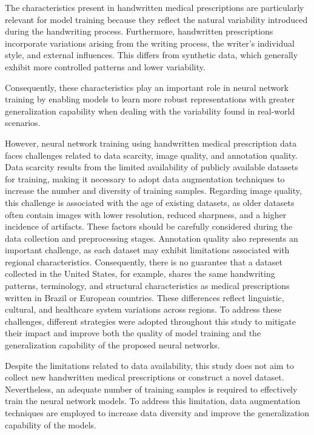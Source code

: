 \documentclass[11pt,a4paper]{article}
\begin{document}
The characteristics present in handwritten medical prescriptions are particularly relevant for model training because they reflect the natural variability introduced during the handwriting process. Furthermore, handwritten prescriptions incorporate variations arising from the writing process, the writer's individual style, and external influences. This differs from synthetic data, which generally exhibit more controlled patterns and lower variability.

Consequently, these characteristics play an important role in neural network training by enabling models to learn more robust representations with greater generalization capability when dealing with the variability found in real-world scenarios.



However, neural network training using handwritten medical prescription data faces challenges related to data scarcity, image quality, and annotation quality. Data scarcity results from the limited availability of publicly available datasets for training, making it necessary to adopt data augmentation techniques to increase the number and diversity of training samples. Regarding image quality, this challenge is associated with the age of existing datasets, as older datasets often contain images with lower resolution, reduced sharpness, and a higher incidence of artifacts. These factors should be carefully considered during the data collection and preprocessing stages. Annotation quality also represents an important challenge, as each dataset may exhibit limitations associated with regional characteristics. Consequently, there is no guarantee that a dataset collected in the United States, for example, shares the same handwriting patterns, terminology, and structural characteristics as medical prescriptions written in Brazil or European countries. These differences reflect linguistic, cultural, and healthcare system variations across regions.  To address these challenges, different strategies were adopted throughout this study to mitigate their impact and improve both the quality of model training and the generalization capability of the proposed neural networks.






Despite the limitations related to data availability, this study does not aim to collect new handwritten medical prescriptions or construct a novel dataset. Nevertheless, an adequate number of training samples is required to effectively train the neural network models. To address this limitation, data augmentation techniques are employed to increase data diversity and improve the generalization capability of the models.
\end{document}
